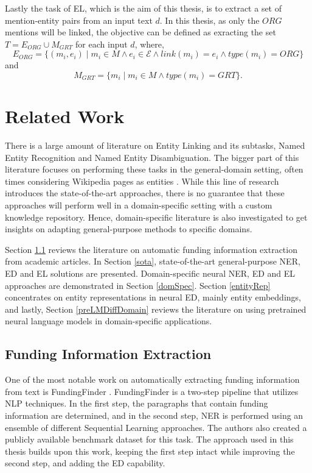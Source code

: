 \documentclass{report}
\theoremstyle{definition}
\theoremstyle{remark}
\begin{document}
Lastly the task of EL, which is the aim of this thesis, is to extract a set of mention-entity pairs from an input text $d$. In this thesis, as only the $ORG$ mentions will be linked, the objective can be defined as exracting the set $T = E_{ORG} \cup M_{GRT}$ for each input $d$, where,
\begin{equation}
E_{ORG}=\{(m_i,e_i) \mid m_i \in M \land e_i \in \mathcal{E} \land link(m_i)=e_i \land type(m_i) = ORG\}
\end{equation}
and 
\begin{equation}
M_{GRT} = \{m_i \mid m_i \in M \land type(m_i) = GRT\}.
\end{equation}
\newpage
\chapter{Related Work}
There is a large amount of literature on Entity Linking and its subtasks, Named Entity Recognition and Named Entity Disambiguation. The bigger part of this literature focuses on performing these tasks in the general-domain setting, often times considering Wikipedia pages as entities \cite{nlpnotes}. While this line of research introduces the state-of-the-art approaches, there is no guarantee that these approaches will perform well in a domain-specific setting with a custom knowledge repository. Hence, domain-specific literature is also investigated to get insights on adapting general-purpose methods to specific domains.

Section \ref{FundingDataExtraction} reviews the literature on automatic funding information extraction from academic articles. In Section \ref{sota}, state-of-the-art general-purpose NER, ED and EL solutions are presented. Domain-specific neural NER, ED and EL approaches are demonstrated in Section \ref{domSpec}. Section \ref{entityRep} concentrates on entity representations in neural ED, mainly entity embeddings, and lastly, Section \ref{preLMDiffDomain} reviews the literature on using pretrained neural language models in domain-specific applications.
\section{Funding Information Extraction}
\label{FundingDataExtraction}

    One of the most notable work on automatically extracting funding information from text is FundingFinder \cite{ElsPaper}. FundingFinder is a two-step pipeline that utilizes NLP techniques. In the first step, the paragraphs that contain funding information are determined, and in the second step, NER is performed using an ensemble of different Sequential Learning approaches. The authors also created a publicly available benchmark dataset for this task. The approach used in this thesis builds upon this work, keeping the first step intact while improving the second step, and adding the ED capability. 
    
\end{document}
